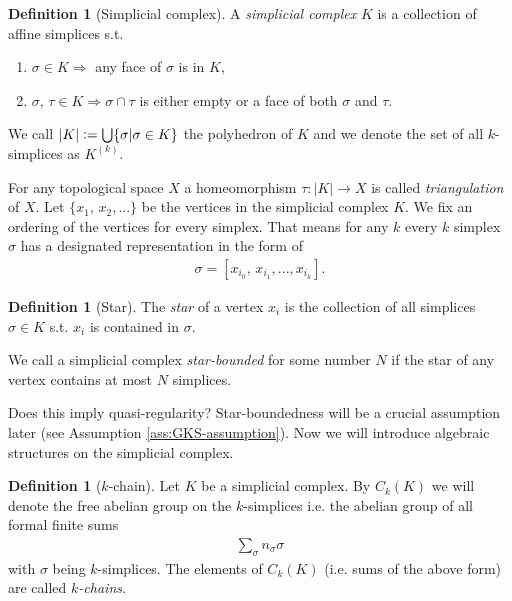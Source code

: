 \documentclass[12pt,a4paper]{article}
\numberwithin{equation}{subsection}
\numberwithin{lemma}{subsection}
\theoremstyle{definition}
\newtheorem{definition}[lemma]{Definition}
\begin{document}
\begin{definition}[Simplicial complex]
    A \textit{simplicial complex} $K$ is a collection of affine simplices s.t.
    \begin{enumerate}
        \item $\sigma \in K \Rightarrow$ any face of $\sigma$ is in $K$,
        \item $\sigma,\, \tau \in K \Rightarrow \sigma \cap \tau$  
                is either empty or a face of both $\sigma$ and $\tau$.
    \end{enumerate}
    We call $|K| \vcentcolon= \bigcup \{ \sigma | \sigma \in K\}$ the polyhedron of 
    $K$ and we denote the set of all $k$-simplices as $K^{(k)}$.
\end{definition}
For any topological space $X$ a homeomorphism 
$\tau: |K| \rightarrow X$ is called \textit{triangulation} of $X$.
Let $\{x_1,\, x_2,...\}$ be the vertices in the simplicial complex $K$.
We fix an ordering of the vertices for every simplex. 
That means for any $k$ every $k$ simplex $\sigma$ has
a designated representation in the form of
\begin{align*}
    \sigma = [x_{i_0},\, x_{i_1}, ...,x_{i_k}].
\end{align*} 

\begin{definition}[Star]
    The \textit{star} of a vertex $x_i$ is the collection of all simplices 
    $\sigma \in K$ s.t. $x_i$ is contained in $\sigma$. 
    
    We call a simplicial complex \textit{star-bounded} for some number $N$ 
    if the star of any vertex contains at most $N$ simplices.
\end{definition}
{\color{red} Does this imply quasi-regularity?}
Star-boundedness will be a crucial assumption later 
(see Assumption \ref{ass:GKS-assumption}). Now we will introduce
algebraic structures on the simplicial complex.

\begin{definition}[$k$-chain]
    Let $K$ be a simplicial complex. By $C_k(K)$ we will denote the 
    free abelian group on the $k$-simplices
    i.e. the abelian group of all formal finite sums
    \begin{align*}
        \sum_\sigma n_\sigma \sigma
    \end{align*}
    with $\sigma$ being $k$-simplices. The elements of $C_k(K)$
    (i.e. sums of the above form) are called \textit{$k$-chains}.
\end{definition}
\end{document}
